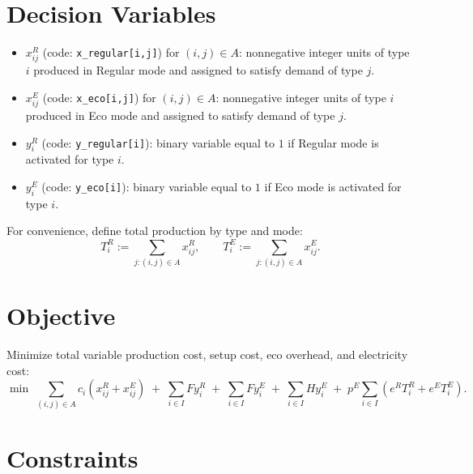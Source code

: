 \section*{Decision Variables}

\begin{itemize}
\item $x^R_{ij}$ (code: \texttt{x\_regular[i,j]}) for $(i,j)\in A$: nonnegative integer units of type $i$ produced in Regular mode and assigned to satisfy demand of type $j$.
\item $x^E_{ij}$ (code: \texttt{x\_eco[i,j]}) for $(i,j)\in A$: nonnegative integer units of type $i$ produced in Eco mode and assigned to satisfy demand of type $j$.
\item $y^R_i$ (code: \texttt{y\_regular[i]}): binary variable equal to $1$ if Regular mode is activated for type $i$.
\item $y^E_i$ (code: \texttt{y\_eco[i]}): binary variable equal to $1$ if Eco mode is activated for type $i$.
\end{itemize}

For convenience, define total production by type and mode:
\[
T^R_i := \sum_{j:(i,j)\in A} x^R_{ij},
\qquad
T^E_i := \sum_{j:(i,j)\in A} x^E_{ij}.
\]

\section*{Objective}

Minimize total variable production cost, setup cost, eco overhead, and electricity cost:
\[
\min \;
\sum_{(i,j)\in A} c_i\left(x^R_{ij}+x^E_{ij}\right)
\;+\;
\sum_{i\in I} F y^R_i
\;+\;
\sum_{i\in I} F y^E_i
\;+\;
\sum_{i\in I} H y^E_i
\;+\;
p^E \sum_{i\in I}\left(e^R T^R_i + e^E T^E_i\right).
\]

\section*{Constraints}

